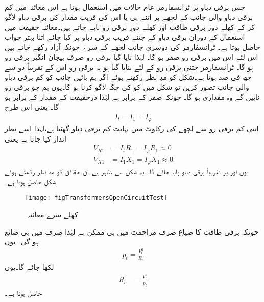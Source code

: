  جس برقی دباو پر ٹرانسفارمر عام حالات میں استعمال ہوتا ہے اس معائنہ میں کم برقی دباو والی جانب کے لچھے پر اتنے ہی یا اس کی قریب مقدار کی برقی دباو  لاگو کر کے کھلے دور برقی طاقت  اور  کھلے دور برقی رو   ناپے جاتے ہیں۔معائنہ حقیقت میں استعمال کے دوران برقی دباو کے جتنے قریب برقی دباو پر کیا جائے اتنا بہتر جواب حاصل ہوتا ہے۔ ٹرانسفارمر کی دوسری جانب لچھے کے سرے چونکہ آزاد رکھے جاتے ہیں اس لئے اس میں  برقی رو صفر ہو گا۔  لہٰذا ناپا گیا برقی رو صرف ہیجان انگیز برقی رو  ہو گا۔ ٹرانسفارمر جتنی برقی رو کے لئے بنایا گیا ہو یہ برقی رو اس  کے تقریباً دو سے چھ  فی صد ہوتا ہے۔شکل    کو مدِ نظر رکھتے ہوئے اگر ہم بائیں جانب کو کم برقی دباو والی جانب تصور کریں تو شکل میں  کو   کی جگہ لاگو کرنا ہو گا۔یوں ہم جو برقی رو ناپیں گے وہ  مقداری   ہو گا۔ چونکہ   صفر کے برابر ہے لہٰذا   درحقیقت  کے مقدار  کے برابر ہو گا۔ یعنی  اس  طرح
\begin{align*}
I_t=I_1=I_\varphi
\end{align*}
اتنی کم برقی رو سے لچھے کی رکاوٹ میں نہایت کم برقی دباو گھٹتا ہے،لہٰذا اسے نظر انداز کیا جاتا ہے یعنی
\begin{align*}
V_{R1}&=I_t R_1=I_\varphi R_1 \approx 0\\
V_{X1}&=I_1 X_1=I_\varphi X_1 \approx 0
\end{align*}
یوں    اور  پر  تقریباً  برقی دباو پایا جائے گا۔ یہ شکل   سے ظاہر ہے۔ان حقائق کو مد نظر رکھتے ہوئے شکل  حاصل ہوتا ہے۔
\begin{figure}
\centering
\texttt{[image: figTransformersOpenCircuitTest]}
\caption{کھلے سرے معائنہ۔}
\label{شکل_ٹرانسفارمر_کھلے_سرے_معائنہ}
\end{figure}

چونکہ برقی طاقت کا ضیاع صرف مزاحمت میں ہی ممکن ہے لہٰذا  صرف    میں ہی ضائع ہو گی۔ یوں
\begin{align*}
p_t=\frac{V_t^2}{R_c}
\end{align*}
لکھا جائے گا۔یوں
\begin{align}\label{مساوات_ٹرانسفارمر_کھلے_دور_مزاحمت_حاصل}
R_c&=\frac{V_t^2}{p_t}
\end{align}
حاصل ہوتا ہے۔

